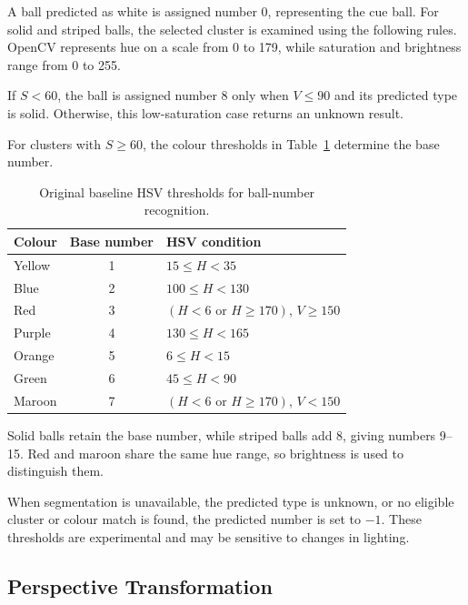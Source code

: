 \documentclass[10pt,a4paper]{article}
\begin{document}
A ball predicted as white is assigned number 0, representing the
cue ball. For solid and striped balls, the selected cluster is
examined using the following rules. OpenCV represents hue on a
scale from 0 to 179, while saturation and brightness range from
0 to 255.

If $S < 60$, the ball is assigned number 8 only when $V \leq 90$
and its predicted type is solid. Otherwise, this low-saturation
case returns an unknown result.

For clusters with $S \geq 60$, the colour thresholds in
Table~\ref{tab:number-thresholds} determine the base number.

\begin{table}[htbp]
    \centering
    \caption{Original baseline HSV thresholds for ball-number recognition.}
    \label{tab:number-thresholds}
    \begin{tabular}{lcl}
        \toprule
        Colour & Base number & HSV condition \\
        \midrule
        Yellow & 1 & $15 \leq H < 35$ \\
        Blue   & 2 & $100 \leq H < 130$ \\
        Red    & 3 & $(H < 6 \text{ or } H \geq 170)$,
                     $V \geq 150$ \\
        Purple & 4 & $130 \leq H < 165$ \\
        Orange & 5 & $6 \leq H < 15$ \\
        Green  & 6 & $45 \leq H < 90$ \\
        Maroon & 7 & $(H < 6 \text{ or } H \geq 170)$,
                     $V < 150$ \\
        \bottomrule
    \end{tabular}
\end{table}
\FloatBarrier

Solid balls retain the base number, while striped balls add 8,
giving numbers 9--15. Red and maroon share the same hue range,
so brightness is used to distinguish them.

When segmentation is unavailable, the predicted type is unknown,
or no eligible cluster or colour match is found, the predicted
number is set to $-1$. These thresholds are experimental and may
be sensitive to changes in lighting.

\subsection{Perspective Transformation}
\end{document}
